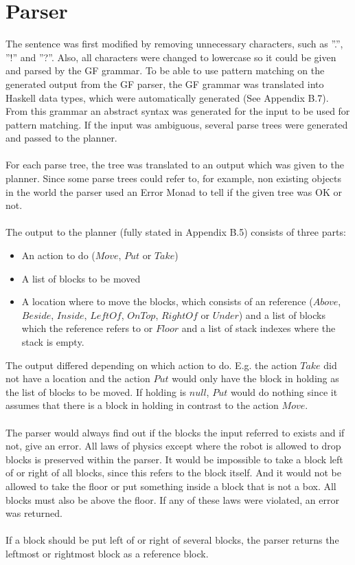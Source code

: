 \section{Parser}
\label{sec:parser}
The sentence was first modified by removing unnecessary characters, such as
''.'', ''!'' and ''?''. Also, all characters were changed to lowercase so it
could be given and parsed by the GF grammar. To be able to use pattern matching
on the generated output from the GF parser, the GF grammar was translated into
Haskell data types, which were automatically generated (See Appendix B.7). From
this grammar an abstract syntax was generated for the input to be used for
pattern matching. If the input was ambiguous, several parse trees were
generated and passed to the planner. \\\\
For each parse tree, the tree was translated to an output which was given to
the planner. Since some parse trees could refer to, for example, non existing
objects in the world the parser used an Error Monad to tell if the given tree
was OK or not. \\\\
The output to the planner (fully stated in Appendix B.5) consists of three parts:
\begin{itemize}
\item An action to do ($Move$, $Put$ or $Take$)
\item A list of blocks to be moved
\item A location where to move the blocks, which consists of an reference
        ($Above$, $Beside$, $Inside$, $LeftOf$, $OnTop$, $RightOf$ or $Under$)
        and a list of blocks which the reference refers to or $Floor$ and a
        list of stack indexes where the stack is empty.
\end{itemize}
The output differed depending on which action to do. E.g. the action $Take$ did
not have a location and the action $Put$ would only have the block in holding
as the list of blocks to be moved. If holding is $null$, $Put$ would do nothing
since it assumes that there is a block in holding in contrast to the action
$Move$.\\\\
The parser would always find out if the blocks the input referred to exists and
if not, give an error. All laws of physics except where the robot is allowed to
drop blocks is preserved within the parser. It would be impossible to take a
block left of or right of all blocks, since this refers to the block itself.
And it would not be allowed to take the floor or put something inside a block
that is not a box. All blocks must also be above the floor. If any of these
laws were violated, an error was returned.
 \\\\
If a block should be put left of or right of several blocks, the parser returns
the leftmost or rightmost block as a reference block. 

